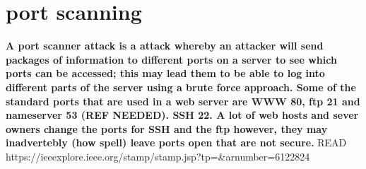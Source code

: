 \section{port scanning}

\textbf{A port scanner attack is a attack whereby an attacker will send packages of information to different ports on a server to see which ports can be accessed; this may lead them to be able to log into different parts of the server using a brute force approach. Some of the standard ports that are used in a web server are WWW 80, ftp 21 and nameserver 53 (REF NEEDED). SSH 22. A lot of web hosts and sever owners change the ports for SSH and the ftp however, they may inadvertebly (how spell) leave ports open that are not secure. }
READ https://ieeexplore.ieee.org/stamp/stamp.jsp?tp=&arnumber=6122824